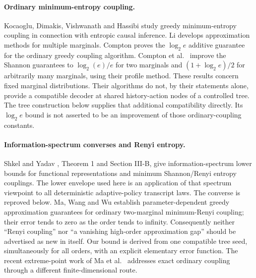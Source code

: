 \documentclass[11pt,a4paper]{article}
\begin{document}
\paragraph{Ordinary minimum-entropy coupling.}
Kocaoglu, Dimakis, Vishwanath and Hassibi \cite{KDVH17} study greedy
minimum-entropy coupling in connection with entropic causal inference.
Li \cite{Li21} develops approximation methods for multiple marginals.
Compton \cite{C22} proves the $\log_2e$ additive guarantee for the ordinary
greedy coupling algorithm. Compton et al.\ \cite{CKQGK23} improve the
Shannon guarantees to $\log_2(e)/e$ for two marginals and
$(1+\log_2e)/2$ for arbitrarily many marginals, using their profile method.
These results concern fixed marginal distributions. Their algorithms do
not, by their statements alone, provide a compatible decoder at shared
history-action nodes of a controlled tree. The tree construction below
supplies that additional compatibility directly. Its $\log_2e$ bound
is not asserted to be an improvement of those ordinary-coupling constants.

\paragraph{Information-spectrum converses and Renyi entropy.}
Shkel and Yadav \cite{SY23}, Theorem 1 and Section III-B, give
information-spectrum lower bounds for functional representations and
minimum Shannon/Renyi entropy couplings. The lower envelope used here
is an application of that spectrum viewpoint to all deterministic
adaptive-policy transcript laws. The converse is reproved below.
Ma, Wang and Wu \cite{MWW25} establish parameter-dependent greedy
approximation guarantees for ordinary two-marginal minimum-Renyi
coupling; their error tends to zero as the order tends to infinity.
Consequently neither ``Renyi coupling'' nor ``a vanishing high-order
approximation gap'' should be advertised as new in itself.
Our bound is derived from one compatible tree seed, simultaneously for
all orders, with an explicit elementary error function.
The recent extreme-point work of Ma et al.\ \cite{MWWC25} addresses exact
ordinary coupling through a different finite-dimensional route.
\end{document}
